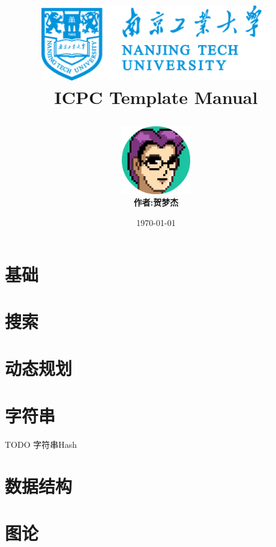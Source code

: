 \documentclass[10pt,a4paper,oneside]{book}
\title{
    \begin{center}
        \includegraphics[width=4in]{logo.png}
        \\ 
        \textbf{ICPC Template Manual}
    \end{center}
}
\author{
    \includegraphics[width=3cm]{author.png}
    \\
    \textbf{作者:贺梦杰}
}
\date{\today}
\begin{document}
    \maketitle
    \tableofcontents

    \chapter{基础}
    

    \chapter{搜索}

    \chapter{动态规划}
    

    \chapter{字符串}
    TODO 字符串Hash
    
    
    


    \chapter{数据结构}
    
    
    
    
    
    
    
    

    \chapter{图论}
    
    
    
    
    
    
    
    
    
    
\end{document}
